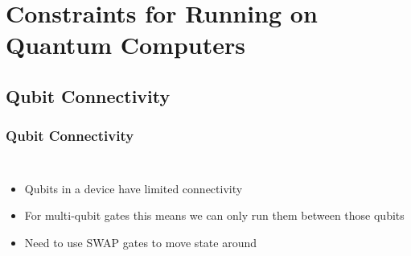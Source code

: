 \documentclass[aspectratio=169,11pt,hyperref={colorlinks=true}]{beamer}
\begin{document}
\section{Constraints for Running on Quantum Computers}
\subsection{Qubit Connectivity}
\begin{frame}
    \frametitle{Qubit Connectivity}
    \begin{columns}
            \begin{itemize}
                \item Qubits in a device have limited connectivity
                \item For multi-qubit gates this means we can only run them
                    between those qubits
                \item Need to use SWAP gates to move state around
            \end{itemize}
            \centering
    \end{columns}
\end{frame}
\end{document}
